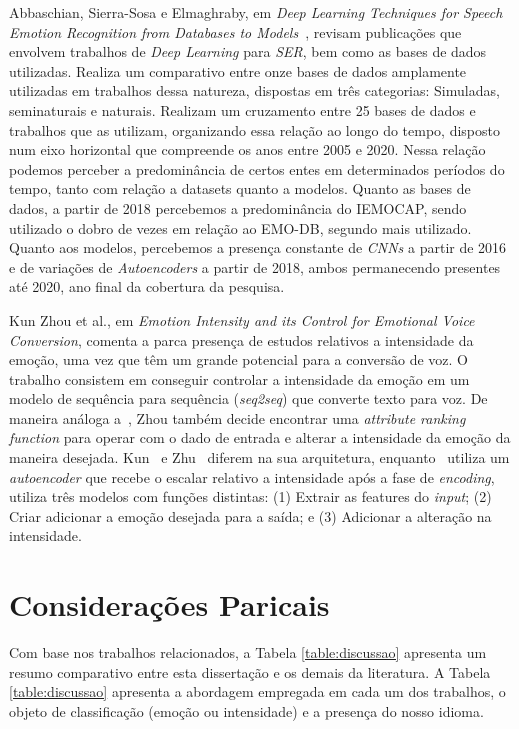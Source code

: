 Abbaschian, Sierra-Sosa e Elmaghraby, em \textit{Deep Learning Techniques for Speech Emotion Recognition from Databases to Models}~\cite{32}, revisam publicações que envolvem trabalhos de \textit{Deep Learning} para \textit{SER}, bem como as bases de dados utilizadas. Realiza um comparativo entre onze bases de dados amplamente utilizadas em trabalhos dessa natureza, dispostas em três categorias: Simuladas, seminaturais e naturais. Realizam um cruzamento entre 25 bases de dados e trabalhos que as utilizam, organizando essa relação ao longo do tempo, disposto num eixo horizontal que compreende os anos entre 2005 e 2020. Nessa relação podemos perceber a predominância de certos entes em determinados períodos do tempo, tanto com relação a datasets quanto a modelos. Quanto as bases de dados, a partir de 2018 percebemos a predominância do IEMOCAP, sendo utilizado o dobro de vezes em relação ao EMO-DB, segundo mais utilizado. Quanto aos modelos, percebemos a presença constante de \textit{CNNs} a partir de 2016 e de variações de \textit{Autoencoders} a partir de 2018, ambos permanecendo presentes até 2020, ano final da cobertura da pesquisa.

Kun Zhou et al., em \textit{Emotion Intensity and its Control for Emotional Voice Conversion}\cite{18}, comenta a parca presença de estudos relativos a intensidade da emoção, uma vez que têm um grande potencial para a conversão de voz. O trabalho consistem em conseguir controlar a intensidade da emoção em um modelo de sequência para sequência (\textit{seq2seq}) que converte texto para voz. De maneira análoga a~\cite{63}, Zhou também decide encontrar uma \textit{attribute ranking function} para operar com o dado de entrada e alterar a intensidade da emoção da maneira desejada. Kun~\cite{18} e Zhu~\cite{63} diferem na sua arquitetura, enquanto~\cite{63} utiliza um \textit{autoencoder} que recebe o escalar relativo a intensidade após a fase de \textit{encoding},~\cite{18} utiliza três modelos com funções distintas: (1) Extrair as features do \textit{input}; (2) Criar adicionar a emoção desejada para a saída; e (3) Adicionar a alteração na intensidade.


\section{Considerações Paricais}

Com base nos trabalhos relacionados, a Tabela \ref{table:discussao} apresenta um resumo comparativo entre esta dissertação e os demais da literatura. A Tabela \ref{table:discussao} apresenta a abordagem empregada em cada um dos trabalhos, o objeto de classificação (emoção ou intensidade) e a presença do nosso idioma.

